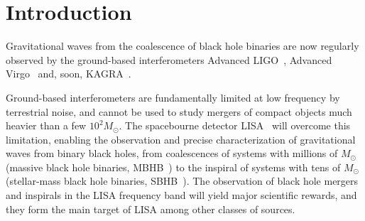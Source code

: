 \documentclass[aps,showpacs,twocolumn,prd,superscriptaddress,nofootinbib]{revtex4-1}
\newcommand{\Msol}{M_{\odot}}
\begin{document}

\maketitle


\section{Introduction}
\label{sec:intro}

%
%
%

Gravitational waves from the coalescence of black hole binaries are now regularly observed \cite{GWTC-1} by the ground-based interferometers Advanced LIGO~\cite{LIGO}, Advanced Virgo~\cite{Virgo} and, soon, KAGRA~\cite{KAGRA}.

Ground-based interferometers are fundamentally limited at low frequency by terrestrial noise, and cannot be used to study mergers of compact objects much heavier than a few $ 10^2 \Msol$. The spacebourne detector LISA~\cite{LISA2017} will overcome this limitation, enabling the observation and precise characterization of gravitational waves from binary black holes, from coalescences of systems with millions of $\Msol$ (massive black hole binaries, MBHB~\cite{Klein+15}) to the inspiral of systems with tens of $\Msol$ (stellar-mass black hole binaries, SBHB~\cite{Sesana16}). The observation of black hole mergers and inspirals in the LISA frequency band will yield major scientific rewards, and they form the main target of LISA among other classes of sources.
\end{document}
